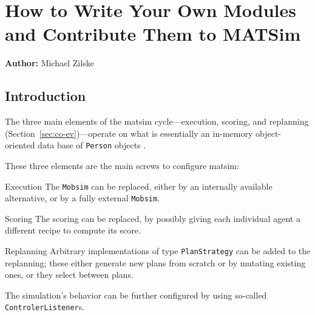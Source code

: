 \chapter{How to Write Your Own Modules and Contribute Them to MATSim}
\label{ch:extensionpoints}
\hfill \textbf{Author:} Michael Zilske

\section{Introduction}
\label{sec:ownmodules-intro}
The three main elements of the \gls{matsim} cycle---execution, scoring, and replanning (Section~\ref{sec:co-ev})---operate on what is essentially an in-memory object-oriented data base of \lstinline|Person| objects \citep{RaneyNagel2006traf-framework}.

These three elements are the main screws to configure \gls{matsim}:
\begin{compactitem}
\item[Execution] The \lstinline|Mobsim| can be replaced, either by an internally available alternative, or by a fully external \lstinline|Mobsim|.
\item[Scoring] The scoring can be replaced, by possibly giving each individual agent a different recipe to compute its score.
\item[Replanning] Arbitrary implementations of type \lstinline|PlanStrategy| can be added to the replanning; these either generate new plans from scratch or by mutating existing ones, or they select between plans.
\end{compactitem}
%
The simulation's behavior can be further configured by using so-called \lstinline|ControlerListener|s.

